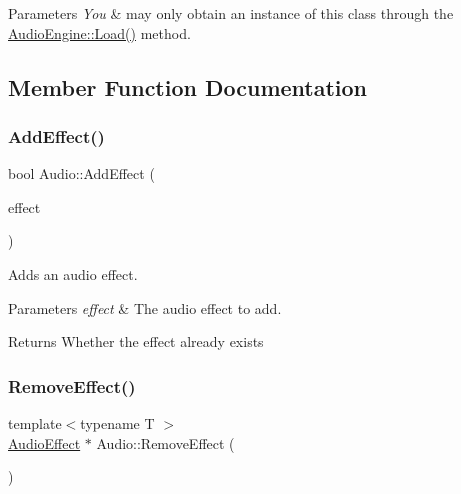 \begin{DoxyParams}{Parameters}
{\em You} & may only obtain an instance of this class through the \hyperlink{class_audio_engine_a7ccb8d2fe6be78b16f457589962aedfe}{Audio\+Engine\+::\+Load()} method. \\
\hline
\end{DoxyParams}


\subsection{Member Function Documentation}
\mbox{\label{class_audio_a1014b0af8df3f0eb3dc1e99e86ad43db}} 
\subsubsection{\texorpdfstring{Add\+Effect()}{AddEffect()}}
{\footnotesize\ttfamily bool Audio\+::\+Add\+Effect (\begin{DoxyParamCaption}\item[{\hyperlink{class_audio_effect}{Audio\+Effect} $\ast$}]{effect }\end{DoxyParamCaption})}



Adds an audio effect. 


\begin{DoxyParams}{Parameters}
{\em effect} & The audio effect to add. \\
\hline
\end{DoxyParams}
\begin{DoxyReturn}{Returns}
Whether the effect already exists 
\end{DoxyReturn}
\mbox{\label{class_audio_a63e37ba7c615699db84188fac87dedc9}} 
\subsubsection{\texorpdfstring{Remove\+Effect()}{RemoveEffect()}}
{\footnotesize\ttfamily template$<$typename T $>$ \\
\hyperlink{class_audio_effect}{Audio\+Effect} $\ast$ Audio\+::\+Remove\+Effect (\begin{DoxyParamCaption}{ }\end{DoxyParamCaption})}



